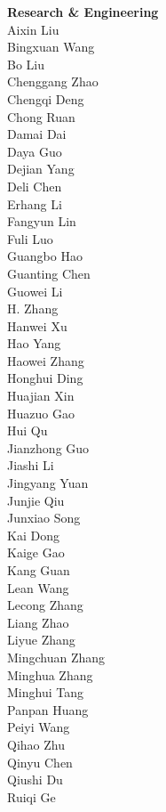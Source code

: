 \documentclass[11pt, a4paper, logo, copyright, nonumbering]{deepseek}
\begin{document}
\begin{CJK*}{UTF8}{gbsn}
\begin{multicols}{2} %
\noindent
\textbf{Research \& Engineering} \\
Aixin Liu \\
Bingxuan Wang \\
Bo Liu \\
Chenggang Zhao \\
Chengqi Deng \\
Chong Ruan \\
Damai Dai \\
Daya Guo \\
Dejian Yang \\
Deli Chen \\
Erhang Li \\
Fangyun Lin \\
Fuli Luo \\
Guangbo Hao \\
Guanting Chen \\
Guowei Li \\
H. Zhang \\
Hanwei Xu \\
Hao Yang \\
Haowei Zhang \\
Honghui Ding \\
Huajian Xin \\
Huazuo Gao \\
Hui Qu \\
Jianzhong Guo \\
Jiashi Li \\
Jingyang Yuan \\
Junjie Qiu \\
Junxiao Song \\
Kai Dong \\
Kaige Gao \\
Kang Guan \\
Lean Wang \\
Lecong Zhang \\
Liang Zhao \\
Liyue Zhang \\
Mingchuan Zhang \\
Minghua Zhang \\
Minghui Tang \\
Panpan Huang \\
Peiyi Wang \\
Qihao Zhu \\
Qinyu Chen \\
Qiushi Du \\
Ruiqi Ge \\

\end{multicols}
\end{CJK*}
\end{document}
